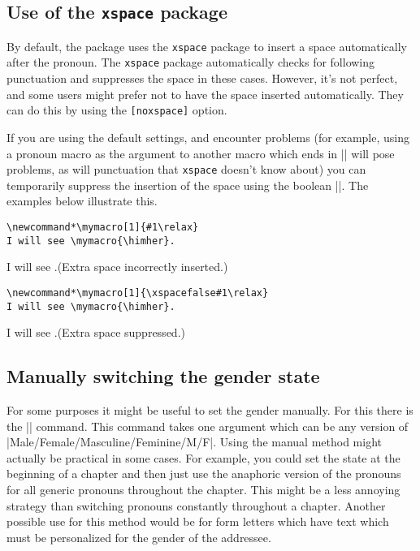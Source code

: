 \documentclass[11pt]{article}
\newcommand*{\pkg}[1]{\texttt{#1}\xspace}
\begin{document}
\subsection{Use of the \pkg{xspace} package}
By default, the package uses the \pkg{xspace} package to insert a space automatically after the pronoun. The \pkg{xspace} package automatically checks for following punctuation and suppresses the space in these cases.  However, it's not perfect, and some users might prefer not to have the space inserted automatically.  They can do this by using the \pkg{[noxspace]} option.

If you are using the default settings, and encounter problems (for example, using a pronoun macro as the argument to another macro which ends in |\relax| will pose problems, as will punctuation that \pkg{xspace} doesn't know about) you can temporarily suppress the insertion of the space using the boolean |\xspacefalse|. The examples below illustrate this.

\newcommand*\mymacro[1]{#1\relax}
\begin{exe}
\ex\label{xspaces}
\begin{xlist}
\ex \begin{lstlisting}
\newcommand*\mymacro[1]{#1\relax}
I will see \mymacro{\himher}.
\end{lstlisting}
\ex I will see \mymacro{\himher}.\hfill(Extra space incorrectly inserted.)
\ex\begin{lstlisting}
\newcommand*\mymacro[1]{\xspacefalse#1\relax}
I will see \mymacro{\himher}.
\end{lstlisting}
\def\mymacro#1{\xspacefalse#1\relax}
\ex I will see \mymacro{\himher}.\hfill(Extra space suppressed.)
\end{xlist}
\end{exe}
\subsection{Manually switching the gender state}
\sloppy For some purposes it might be useful to set the gender manually.  For this there is the |\setgender{}| command. This command takes one argument which can be any version of |Male/Female/Masculine/Feminine/M/F|. Using the manual method might actually be practical in some cases.  For example, you could set the state at the beginning of a chapter and then just use the anaphoric version of the pronouns for all generic pronouns throughout the chapter.  This might be a less annoying strategy than switching pronouns constantly throughout a chapter. Another possible use for this method would be for form letters which have text which must be personalized for the gender of the addressee.
\end{document}
